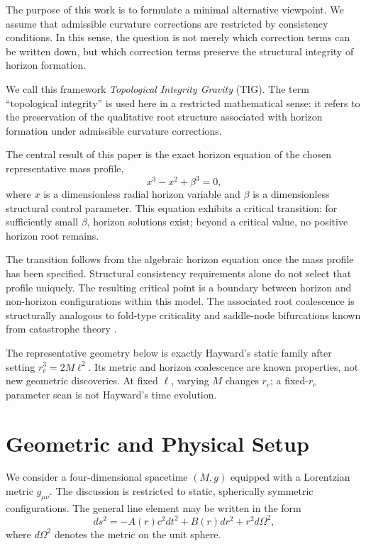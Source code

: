\documentclass[11pt,a4paper]{article}
\begin{document}
The purpose of this work is to formulate a minimal alternative viewpoint. We
assume that admissible curvature corrections are restricted by consistency
conditions. In this sense, the question is not merely which correction terms can
be written down, but which correction terms preserve the structural integrity of
horizon formation.

We call this framework \emph{Topological Integrity Gravity} (TIG). The term
``topological integrity'' is used here in a restricted mathematical sense: it
refers to the preservation of the qualitative root structure associated with
horizon formation under admissible curvature corrections.

The central result of this paper is the exact horizon equation of the chosen
representative mass profile,
\begin{equation}
x^3 - x^2 + \beta^3 = 0,
\label{eq:intro_cubic}
\end{equation}
where \(x\) is a dimensionless radial horizon variable and \(\beta\) is a
dimensionless structural control parameter. This equation exhibits a critical
transition: for sufficiently small \(\beta\), horizon solutions exist; beyond a
critical value, no positive horizon root remains.

The transition follows from the algebraic horizon equation once the mass
profile has been specified. Structural consistency requirements alone do not
select that profile uniquely. The resulting critical point is a boundary
between horizon and non-horizon configurations within this model. The associated root coalescence is structurally analogous to
fold-type criticality and saddle-node bifurcations known from catastrophe theory
\cite{arnold1992}.

The representative geometry below is exactly Hayward's static family
\cite{hayward2006} after setting $r_c^3=2M\ell^2$. Its metric and horizon
coalescence are known properties, not new geometric discoveries.
At fixed $\ell$, varying $M$ changes $r_c$; a fixed-$r_c$ parameter scan is
not Hayward's time evolution.

\section{Geometric and Physical Setup}

We consider a four-dimensional spacetime \((M,g)\) equipped with a Lorentzian
metric \(g_{\mu\nu}\). The discussion is restricted to static, spherically
symmetric configurations. The general line element may be written in the form
\begin{equation}
ds^2 = -A(r)c^2dt^2 + B(r)dr^2 + r^2 d\Omega^2,
\label{eq:metric}
\end{equation}
where \(d\Omega^2\) denotes the metric on the unit sphere.
\end{document}

